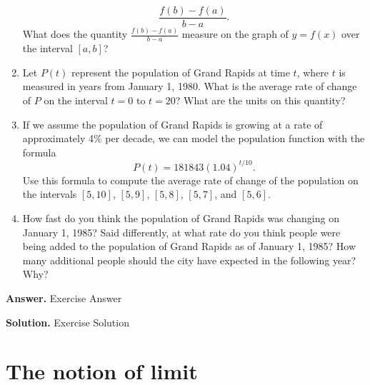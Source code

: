 \documentclass[10pt,]{book}
\theoremstyle{plain}
\theoremstyle{definition}
\theoremstyle{definition}
\theoremstyle{definition}
\theoremstyle{definition}
\theoremstyle{definition}
\numberwithin{equation}{section}
\begin{document}
\begin{exerciselist}
\begin{enumerate}[label=\alph*]
              \begin{equation*}
              \frac{f(b)-f(a)}{b-a}.
              \end{equation*}
              What does the quantity \(\frac{f(b)-f(a)}{b-a}\) measure on the graph of \(y = f(x)\) over the interval \([a,b]\)?%
\item\hypertarget{li-36}{}Let \(P(t)\) represent the population of Grand Rapids at time \(t\), where \(t\) is measured in years from January 1, 1980.  What is the average rate of change of \(P\) on the interval \(t = 0\) to \(t = 20\)?  What are the units on this quantity?%
\item\hypertarget{li-37}{}If we assume the population of Grand Rapids is growing at a rate of approximately 4\% per decade,  we can model the population function with the formula 
              \begin{equation*}
              P(t) = 181843 (1.04)^{t/10}.
              \end{equation*}
                 Use this formula to compute the average rate of change of the population on the intervals \([5,10]\), \([5,9]\), \([5,8]\), \([5,7]\), and \([5,6]\).%
\item\hypertarget{li-38}{}How fast do you think the population of Grand Rapids was changing on January 1, 1985?  Said differently, at what rate do you think people were being added to the population of Grand Rapids as of January 1, 1985?  How many additional people should the city have expected in the following year?  Why?%
\end{enumerate}
\par\smallskip
\par\smallskip
\noindent\textbf{Answer.}\hypertarget{answer-6}{}\quad
Exercise Answer%
\par\smallskip
\noindent\textbf{Solution.}\hypertarget{solution-7}{}\quad
Exercise Solution%
\end{exerciselist}
\typeout{************************************************}
\typeout{************************************************}
\section[{The notion of limit}]{The notion of limit}\label{sec-1-2-lim}
\typeout{************************************************}
\typeout{************************************************}
\end{document}
